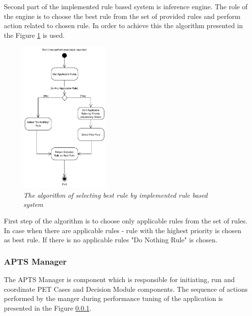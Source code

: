 \documentclass[10pt,a4paper]{article}
\begin{document}
\pagebreak


Second part of the implemented rule based system is inference engine. The role of the engine is to choose the best rule from the set of provided rules and perform action related to chosen rule. In order to achieve this the algorithm presented in the Figure \ref{dmalgorithm} is used. 

\begin{figure}[!htb]
\centering
\includegraphics[width=0.4\textwidth]{DecisionModuleActivityDiagram}
\caption{\textit{The algorithm of selecting best rule by implemented rule based system}} \label{dmalgorithm}
\end{figure}

First step of the algorithm is to choose only applicable rules from the set of rules. In case when there are applicable rules - rule with the highest priority is chosen as best rule. If there is no applicable rules "Do Nothing Rule" is chosen.

\subsubsection{APTS Manager} \label{manager}

The APTS Manager is component which is responsible for initiating, run and coordinate PET Cases and Decision Module components. The sequence of actions performed by the manger during performance tuning of the application is presented in the Figure \ref{manager}.
\end{document}
